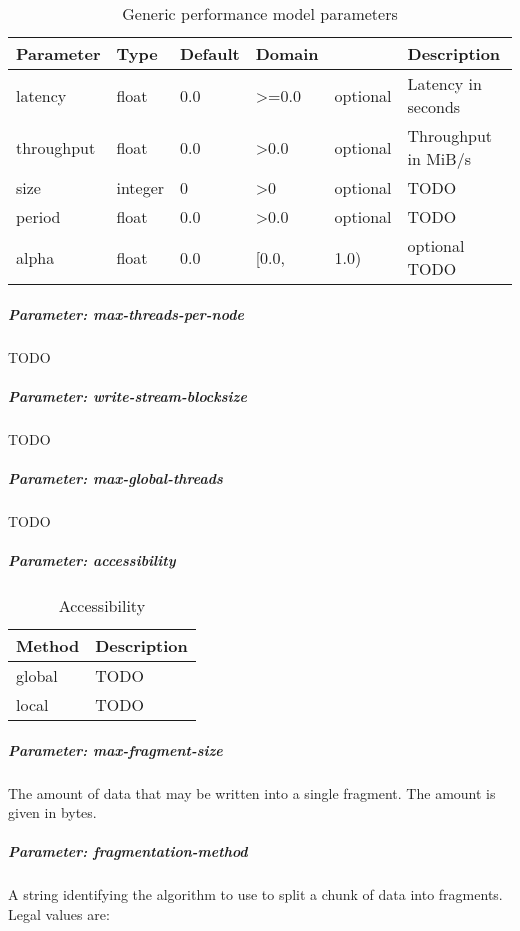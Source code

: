 \begin{table}[!ht]
  \centering
  \begin{tabularx}{\textwidth}{lllllX}
    Parameter  & Type    & Default & Domain &          & Description         \\ 
    \hline
    latency    & float   & 0.0     & >=0.0  & optional & Latency in seconds  \\ 
    throughput & float   & 0.0     & >0.0   & optional & Throughput in MiB/s \\ 
    size       & integer & 0       & >0     & optional & TODO                \\ 
    period     & float   & 0.0     & >0.0   & optional & TODO                \\ 
    alpha      & float   & 0.0     & [0.0,  & 1.0)     & optional TODO       \\ 
  \end{tabularx}
  \caption{Generic performance model parameters}%
  \label{tab:gen_perf_model_conf_params}
\end{table}



\subparagraph{Parameter: max-threads-per-node}
TODO

\subparagraph{Parameter: write-stream-blocksize}
TODO

\subparagraph{Parameter: max-global-threads}
TODO

\subparagraph{Parameter: accessibility}

\begin{table}[!ht]
  \centering
  \begin{tabularx}{\textwidth}{lX}
    Method & Description \\ 
    \hline
    global & TODO        \\ 
    local  & TODO        \\ 
  \end{tabularx}
  \caption{Accessibility}%
  \label{tab:accessibility}
\end{table}

\subparagraph{Parameter: max-fragment-size}
The amount of data that may be written into a single fragment. 
The amount is given in bytes.

\subparagraph{Parameter: fragmentation-method}
A string identifying the algorithm to use to split a chunk of data into fragments. 
Legal values are:

